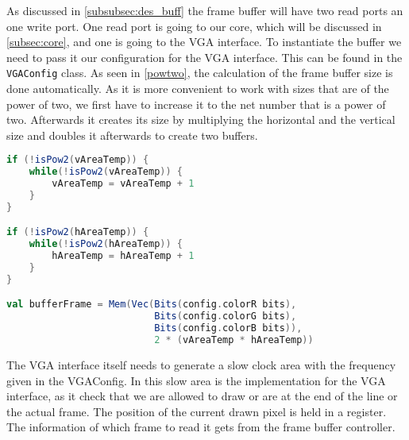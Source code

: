 As discussed in \cref{subsubsec:des_buff} the frame buffer will have two read ports an one write port. One read port is going to our core, which will be discussed in \cref{subsec:core}, and one is going to the VGA interface. To instantiate the buffer we need to pass it our configuration for the VGA interface. This can be found in the \texttt{VGAConfig} class. As seen in \cref{powtwo}, the calculation of the frame buffer size is done automatically. As it is more convenient to work with sizes that are of the power of two, we first have to increase it to the net number that is a power of two. Afterwards it creates its size by multiplying the horizontal and the vertical size and doubles it afterwards to create two buffers. 
\begin{lstlisting}[language=scala, caption={Resolution Check}, label=powtwo]
if (!isPow2(vAreaTemp)) {
	while(!isPow2(vAreaTemp)) {
		vAreaTemp = vAreaTemp + 1
	}
}

if (!isPow2(hAreaTemp)) {
	while(!isPow2(hAreaTemp)) {
		hAreaTemp = hAreaTemp + 1
	}
}

val bufferFrame = Mem(Vec(Bits(config.colorR bits), 
			  			  Bits(config.colorG bits), 
			  			  Bits(config.colorB bits)), 
			  			  2 * (vAreaTemp * hAreaTemp))
\end{lstlisting}
The VGA interface itself needs to generate a slow clock area with the frequency given in the VGAConfig. In this slow area is the implementation for the VGA interface, as it check that we are allowed to draw or are at the end of the line or the actual frame. The position of the current drawn pixel is held in a register. The information of which frame to read it gets from the frame buffer controller.
